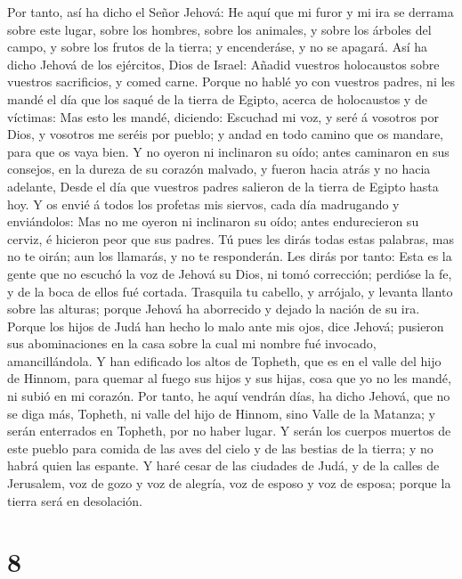  Por tanto, así ha dicho el Señor Jehová: He aquí que mi
furor y mi ira se derrama sobre este lugar, sobre los hombres, sobre los
animales, y sobre los árboles del campo, y sobre los frutos de la
tierra; y encenderáse, y no se apagará.  Así ha dicho
Jehová de los ejércitos, Dios de Israel: Añadid vuestros holocaustos
sobre vuestros sacrificios, y comed carne.  Porque no
hablé yo con vuestros padres, ni les mandé el día que los saqué de la
tierra de Egipto, acerca de holocaustos y de víctimas: 
Mas esto les mandé, diciendo: Escuchad mi voz, y seré á vosotros por
Dios, y vosotros me seréis por pueblo; y andad en todo camino que os
mandare, para que os vaya bien.  Y no oyeron ni
inclinaron su oído; antes caminaron en sus consejos, en la dureza de su
corazón malvado, y fueron hacia atrás y no hacia adelante,
 Desde el día que vuestros padres salieron de la tierra
de Egipto hasta hoy. Y os envié á todos los profetas mis siervos, cada
día madrugando y enviándolos:  Mas no me oyeron ni
inclinaron su oído; antes endurecieron su cerviz, é hicieron peor que
sus padres.  Tú pues les dirás todas estas palabras, mas
no te oirán; aun los llamarás, y no te responderán.  Les
dirás por tanto: Esta es la gente que no escuchó la voz de Jehová su
Dios, ni tomó corrección; perdióse la fe, y de la boca de ellos fué
cortada.  Trasquila tu cabello, y arrójalo, y levanta
llanto sobre las alturas; porque Jehová ha aborrecido y dejado la nación
de su ira.  Porque los hijos de Judá han hecho lo malo
ante mis ojos, dice Jehová; pusieron sus abominaciones en la casa sobre
la cual mi nombre fué invocado, amancillándola.  Y han
edificado los altos de Topheth, que es en el valle del hijo de Hinnom,
para quemar al fuego sus hijos y sus hijas, cosa que yo no les mandé, ni
subió en mi corazón.  Por tanto, he aquí vendrán días, ha
dicho Jehová, que no se diga más, Topheth, ni valle del hijo de Hinnom,
sino Valle de la Matanza; y serán enterrados en Topheth, por no haber
lugar.  Y serán los cuerpos muertos de este pueblo para
comida de las aves del cielo y de las bestias de la tierra; y no habrá
quien las espante.  Y haré cesar de las ciudades de Judá,
y de la calles de Jerusalem, voz de gozo y voz de alegría, voz de esposo
y voz de esposa; porque la tierra será en desolación.

\hypertarget{section-7}{%
\section{8}\label{section-7}}


